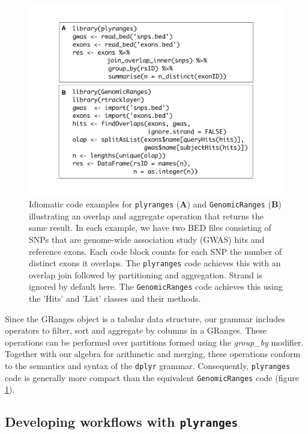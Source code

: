 \documentclass[]{article}
\begin{document}
\begin{figure}
\includegraphics[width=\textwidth]{diagrams/code-comparison.pdf}
\caption{Idiomatic code examples for \texttt{plyranges} (\textbf{A}) and 
\texttt{GenomicRanges} (\textbf{B}) illustrating an overlap and aggregate 
operation that returns the same result. 
In each example, we have two BED files consisting of SNPs that are
genome-wide association study (GWAS) hits and reference exons. Each code block
counts for each SNP the number of distinct exons it overlaps. The 
\texttt{plyranges} code achieves this with an overlap join followed by partitioning
and aggregation. Strand is ignored by default here. 
The \texttt{GenomicRanges} code achieves this using the 'Hits' and 'List' 
classes and their methods.}
\label{fig:code}
\end{figure}

Since the GRanges object is a tabular data structure, our grammar
includes operators to filter, sort and aggregate by columns in a
GRanges. These operations can be performed over partitions formed using
the \emph{group\_by} modifier. Together with our algebra for arithmetic
and merging, these operations conform to the semantics and syntax of the
\texttt{dplyr} grammar. Consequently, \texttt{plyranges} code is
generally more compact than the equivalent \texttt{GenomicRanges} code
(figure \ref{fig:code}).

\hypertarget{developing-workflows-with-plyranges}{%
\subsection{\texorpdfstring{Developing workflows with
\texttt{plyranges}}{Developing workflows with plyranges}}\label{developing-workflows-with-plyranges}}
\end{document}
